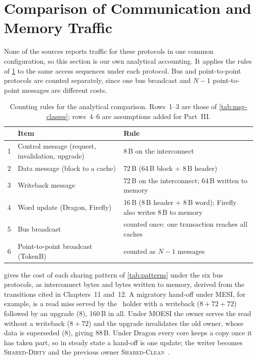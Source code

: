 \section{Comparison of Communication and Memory Traffic}
\label{sec:cmp-traffic}
%

None of the sources reports traffic for these protocols in one common
configuration, so this section is our own analytical accounting. It applies the
rules of \cref{tab:counting-rules} to the same access sequences under each
protocol. Bus and point-to-point protocols are counted separately, since one bus
broadcast and $N-1$ point-to-point messages are different costs.

\begin{table}[htbp]
\centering
\caption{Counting rules for the analytical comparison. Rows~1--3 are those of
\cref{tab:msg-classes}; rows~4--6 are assumptions added for Part~III.}
\label{tab:counting-rules}
\small
\begin{tabular}{@{}c L{5.4cm} L{6.0cm}@{}}
\toprule
 & Item & Rule \\
 & Control message (request, invalidation, upgrade) & 8\,B on the interconnect \\
2 & Data message (block to a cache) & 72\,B (64\,B block + 8\,B header) \\
3 & Writeback message & 72\,B on the interconnect; 64\,B written to memory \\
4 & Word update (Dragon, Firefly) & 16\,B (8\,B header + 8\,B word); Firefly
  also writes 8\,B to memory \\
5 & Bus broadcast & counted once: one transaction reaches all caches \\
6 & Point-to-point broadcast (TokenB) & counted as $N-1$ messages \\
\bottomrule
\end{tabular}
\end{table}

 gives the cost of each sharing pattern of
\cref{tab:patterns} under the six bus protocols, as interconnect bytes and bytes
written to memory, derived from the transitions cited in Chapters~11 and~12. A
migratory hand-off under MESI, for example, is a read miss served by the \stM\
holder with a writeback ($8+72+72$) followed by an upgrade (8), 160\,B in all.
Under MOESI the owner serves the read without a writeback ($8+72$) and the upgrade
invalidates the old owner, whose data is superseded (8), giving 88\,B. Under
Dragon every core keeps a copy once it has taken part, so in steady state a
hand-off is one update; the writer becomes \textsc{Shared-Dirty} and the previous
owner \textsc{Shared-Clean}~\cite[p.~282]{archibald1986evaluation}.


